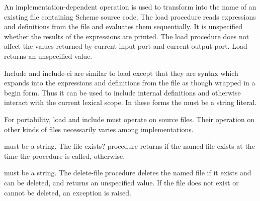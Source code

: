 \begin{entry}{%
}


An implementation-dependent operation is used to transform
 into the name of an existing file
containing Scheme source code.  The {\cf load} procedure reads
expressions and definitions from the file and evaluates them
sequentially.  It is unspecified whether the results of the expressions
are printed.  The {\cf load} procedure does not affect the values
returned by {\cf current-input-port} and {\cf current-output-port}.
{\cf Load} returns an unspecified value.

\end{entry}

\begin{entry}{%
}

{\cf Include} and {\cf include-ci} are similar to {\cf load} except
that they are syntax which expands into the expressions and
definitions from the file as though wrapped in a {\cf begin} form.
Thus it can be used to include internal definitions and otherwise
interact with the current lexical scope.  In these forms the
 must be a string literal.

\begin{rationale}
For portability, {\cf load} and {\cf include} must operate on source files.
Their operation on other kinds of files necessarily varies among
implementations.
\end{rationale}
\end{entry}

\begin{entry}{%
}

 must be a string. The {\cf file-exists?} procedure returns
\schtrue{} if the named file exists at the time the procedure is called,
\schfalse{} otherwise.

\end{entry}

\begin{entry}{%
}

 must be a string. The {\cf delete-file} procedure deletes the
named file if it exists and can be deleted, and returns an unspecified
value.  If the file does not exist or cannot be deleted, an exception
is raised.

\end{entry}


